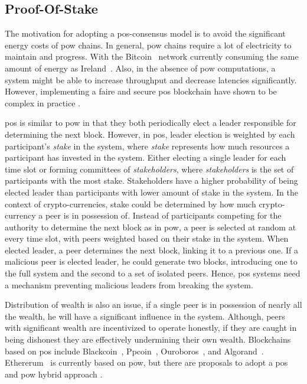 \documentclass[USenglish]{uit-thesis}
\begin{document}
\subsection{Proof-Of-Stake}
The motivation for adopting a \gls{pos}-consensus model is to avoid the significant energy costs of \gls{pow} chains.
In general, \gls{pow} chains require a lot of electricity to maintain and progress.
With the Bitcoin~\cite{bitcoin} network currently consuming the same amount of energy as Ireland~\cite{bitenergy}.
Also, in the absence of \gls{pow} computations, a system might be able to increase throughput and decrease latencies significantly.
However, implementing a faire and secure \gls{pos} blockchain have shown to be complex in practice \cite{challengepos}.   

\gls{pos} is similar to \gls{pow} in that they both periodically elect a leader responsible for determining the next block.
However, in \gls{pos}, leader election is weighted by each participant's \textit{stake} in the system, where \textit{stake} represents how much resources a participant has invested in the system.
Either electing a single leader for each time slot or forming committees of \textit{stakeholders}, where \textit{stakeholders} is the set of participants with the most stake.
Stakeholders have a higher probability of being elected leader than participants with lower amount of stake in the system. 
In the context of crypto-currencies, stake could be determined by how much crypto-currency a peer is in possession of.
Instead of participants competing for the authority to determine the next block as in \gls{pow}, a peer is selected at random at every time slot, with peers weighted based on their stake in the system.
When elected leader, a peer determines the next block, linking it to a previous one.
If a malicious peer is elected leader, he could generate two blocks, introducing one to the full system and the second to a set of isolated peers.
Hence, \gls{pos} systems need a mechanism preventing malicious leaders from breaking the system.

Distribution of wealth is also an issue, if a single peer is in possession of nearly all the wealth, he will have a significant influence in the system.
Although, peers with significant wealth are incentivized to operate honestly, if they are caught in being dishonest they are effectively undermining their own wealth.
Blockchains based on \gls{pos} include Blackcoin~\cite{blackcoin}, Ppcoin~\cite{ppcoin}, Ouroboros~\cite{provepos}, and Algorand~\cite{algorand}.
Ethererum~\cite{ether} is currently based on \gls{pow}, but there are proposals to adopt a \gls{pos} and \gls{pow} hybrid approach \cite{casper}.
\end{document}
